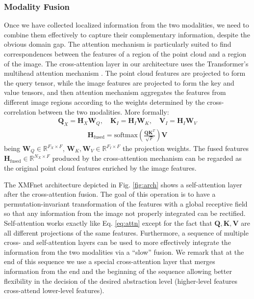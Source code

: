 \documentclass{article}
\newcommand{\Hb}{\mathbf{H}}
\newcommand{\Qb}{\mathbf{Q}}
\newcommand{\Kb}{\mathbf{K}}
\newcommand{\Vb}{\mathbf{V}}
\newcommand{\Wb}{\mathbf{W}}
\begin{document}
\subsubsection{Modality Fusion}
Once we have collected localized information from the two modalities, we need to combine them effectively to capture their complementary information, despite the obvious domain gap. The attention mechanism is particularly suited to find correspondences between the features of a region of the point cloud and a region of the image. The cross-attention layer in our architecture uses the Transformer's multihead attention mechanism \cite{attention}. The point cloud features are projected to form the query tensor, while the image features are projected to form the key and value tensors, and then attention mechanism aggregates the features from different image regions according to the weights determined by the cross-correlation between the two modalities. More formally:
\begin{align}\label{eq:qkv_proj}
\Qb_{X} = \Hb_{X}\Wb_{Q}, \quad \Kb_{I} = \Hb_{I}\Wb_{K}, \quad \Vb_{I} = \Hb_{I}\Wb_{V}
\end{align}
\begin{align}\label{eq:attn}
\Hb_{\text{fused}} = \text{softmax}\left( \frac{\Qb\Kb^T}{\sqrt{F}} \right)\Vb
\end{align}
being $\Wb_{Q} \in \mathbb{R}^{F_X \times F}$, $\Wb_{K}, \Wb_{V} \in \mathbb{R}^{F_I \times F}$ the projection weights. The fused features $\Hb_{\text{fused}} \in \mathbb{R}^{N_X \times F}$ produced by the cross-attention mechanism can be regarded as the original point cloud features enriched by the image features.  

The XMFnet architecture depicted in Fig. \ref{fig:arch} shows a self-attention layer after the cross-attention fusion. The goal of this operation is to have a permutation-invariant transformation of the features with a global receptive field so that any information from the image not properly integrated can be rectified. Self-attention works exactly like Eq. \eqref{eq:attn} except for the fact that $\Qb,\Kb,\Vb$ are all different projections of the same features. Furthermore, a sequence of multiple cross- and self-attention layers can be used to more effectively integrate the information from the two modalities via a ``slow'' fusion. We remark that at the end of this sequence we use a special cross-attention layer that merges information from the end and the beginning of the sequence allowing better flexibility in the decision of the desired abstraction level (higher-level features cross-attend lower-level features). 
\end{document}
